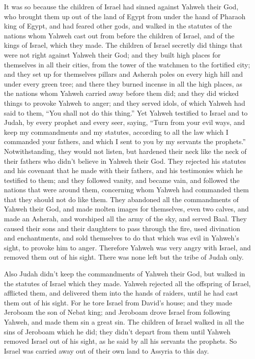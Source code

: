  It was so because the children of Israel had sinned against
Yahweh their God, who brought them up out of the land of Egypt from
under the hand of Pharaoh king of Egypt, and had feared other gods,
 and walked in the statutes of the nations whom Yahweh cast
out from before the children of Israel, and of the kings of Israel,
which they made.  The children of Israel secretly did things
that were not right against Yahweh their God; and they built high places
for themselves in all their cities, from the tower of the watchmen to
the fortified city;  and they set up for themselves pillars
and Asherah poles on every high hill and under every green tree;
 and there they burned incense in all the high places, as
the nations whom Yahweh carried away before them did; and they did
wicked things to provoke Yahweh to anger;  and they served
idols, of which Yahweh had said to them, ``You shall not do this
thing.''  Yet Yahweh testified to Israel and to Judah, by
every prophet and every seer, saying, ``Turn from your evil ways, and
keep my commandments and my statutes, according to all the law which I
commanded your fathers, and which I sent to you by my servants the
prophets.''  Notwithstanding, they would not listen, but
hardened their neck like the neck of their fathers who didn't believe in
Yahweh their God.  They rejected his statutes and his
covenant that he made with their fathers, and his testimonies which he
testified to them; and they followed vanity, and became vain, and
followed the nations that were around them, concerning whom Yahweh had
commanded them that they should not do like them.  They
abandoned all the commandments of Yahweh their God, and made molten
images for themselves, even two calves, and made an Asherah, and
worshiped all the army of the sky, and served Baal.  They
caused their sons and their daughters to pass through the fire, used
divination and enchantments, and sold themselves to do that which was
evil in Yahweh's sight, to provoke him to anger.  Therefore
Yahweh was very angry with Israel, and removed them out of his sight.
There was none left but the tribe of Judah only.

 Also Judah didn't keep the commandments of Yahweh their
God, but walked in the statutes of Israel which they made. 
Yahweh rejected all the offspring of Israel, afflicted them, and
delivered them into the hands of raiders, until he had cast them out of
his sight.  For he tore Israel from David's house; and they
made Jeroboam the son of Nebat king; and Jeroboam drove Israel from
following Yahweh, and made them sin a great sin.  The
children of Israel walked in all the sins of Jeroboam which he did; they
didn't depart from them  until Yahweh removed Israel out of
his sight, as he said by all his servants the prophets. So Israel was
carried away out of their own land to Assyria to this day.

